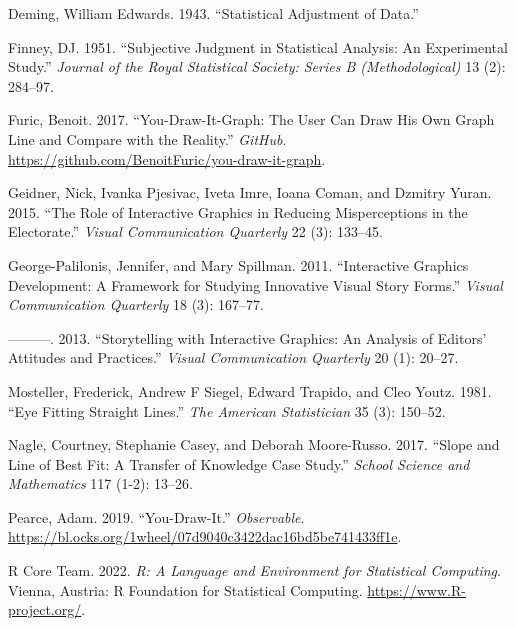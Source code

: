\documentclass[
]{jds}
\newlength{\cslhangindent}
\newlength{\cslentryspacingunit} %
\newenvironment{CSLReferences}[2] %
 {%
  \setlength{\parindent}{0pt}
  \ifodd #1
  \let\oldpar\par
  \def\par{\hangindent=\cslhangindent\oldpar}
  \fi
  \setlength{\parskip}{#2\cslentryspacingunit}
 }%
 {}
\begin{document}
\begin{CSLReferences}{1}{0}
\leavevmode{}%
Deming, William Edwards. 1943. {``Statistical Adjustment of Data.''}

\leavevmode{}%
Finney, DJ. 1951. {``Subjective Judgment in Statistical Analysis: An
Experimental Study.''} \emph{Journal of the Royal Statistical Society:
Series B (Methodological)} 13 (2): 284--97.

\leavevmode{}%
Furic, Benoit. 2017. {``You-Draw-It-Graph: The User Can Draw His Own
Graph Line and Compare with the Reality.''} \emph{GitHub}.
\url{https://github.com/BenoitFuric/you-draw-it-graph}.

\leavevmode{}%
Geidner, Nick, Ivanka Pjesivac, Iveta Imre, Ioana Coman, and Dzmitry
Yuran. 2015. {``The Role of Interactive Graphics in Reducing
Misperceptions in the Electorate.''} \emph{Visual Communication
Quarterly} 22 (3): 133--45.

\leavevmode{}%
George-Palilonis, Jennifer, and Mary Spillman. 2011. {``Interactive
Graphics Development: A Framework for Studying Innovative Visual Story
Forms.''} \emph{Visual Communication Quarterly} 18 (3): 167--77.

\leavevmode{}%
---------. 2013. {``Storytelling with Interactive Graphics: An Analysis
of Editors' Attitudes and Practices.''} \emph{Visual Communication
Quarterly} 20 (1): 20--27.

\leavevmode{}%
Mosteller, Frederick, Andrew F Siegel, Edward Trapido, and Cleo Youtz.
1981. {``Eye Fitting Straight Lines.''} \emph{The American Statistician}
35 (3): 150--52.

\leavevmode{}%
Nagle, Courtney, Stephanie Casey, and Deborah Moore-Russo. 2017.
{``Slope and Line of Best Fit: A Transfer of Knowledge Case Study.''}
\emph{School Science and Mathematics} 117 (1-2): 13--26.

\leavevmode{}%
Pearce, Adam. 2019. {``You-Draw-It.''} \emph{Observable}.
\url{https://bl.ocks.org/1wheel/07d9040c3422dac16bd5be741433ff1e}.

\leavevmode{}%
R Core Team. 2022. \emph{R: A Language and Environment for Statistical
Computing}. Vienna, Austria: R Foundation for Statistical Computing.
\url{https://www.R-project.org/}.


\end{CSLReferences}
\end{document}
